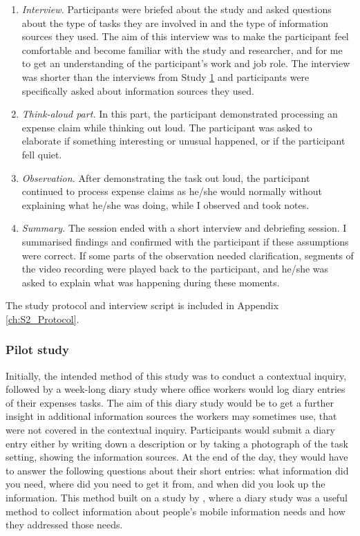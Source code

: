 \begin{enumerate}
\item 
\textit{Interview.} Participants were briefed about the study and asked questions about the type of tasks they are involved in and the type of information sources they used. The aim of this interview was to make the participant feel comfortable and become familiar with the study and researcher, and for me to get an understanding of the participant’s work and job role. The interview was shorter than the interviews from Study \hyperref[st:Study1]{1} and participants were specifically asked about information sources they used.
\item 
\textit{Think-aloud part.}  In this part, the participant demonstrated processing an expense claim while thinking out loud. The participant was asked to elaborate if something interesting or unusual happened, or if the participant fell quiet.
\item 
\textit{Observation.}
After demonstrating the task out loud, the participant continued to process expense claims as he/she would normally without explaining what he/she was doing, while I observed and took notes.
\item 
\textit{Summary.} The session ended with a short interview and debriefing session. I summarised findings and confirmed with the participant if these assumptions were correct. If some parts of the observation needed clarification, segments of the video recording were played back to the participant, and he/she was asked to explain what was happening during these moments.
\end{enumerate}

The study protocol and interview script is included in Appendix \ref{ch:S2_Protocol}.

\subsubsection{Pilot study}
Initially, the intended method of this study was to conduct a contextual inquiry, followed by a week-long diary study where office workers would log diary entries of their expenses tasks. The aim of this diary study would be to get a further insight in additional information sources the workers may sometimes use, that were not covered in the contextual inquiry.  Participants would submit a diary entry either by writing down a description or by taking a photograph of the task setting, showing the information sources. At the end of the day, they would have to answer the following questions about their short entries: what information did you need, where did you need to get it from, and when did you look up the information. This method built on a study by \citet{Sohn2008}, where a diary study was a useful method to collect information about people's mobile information needs and how they addressed those needs. 

